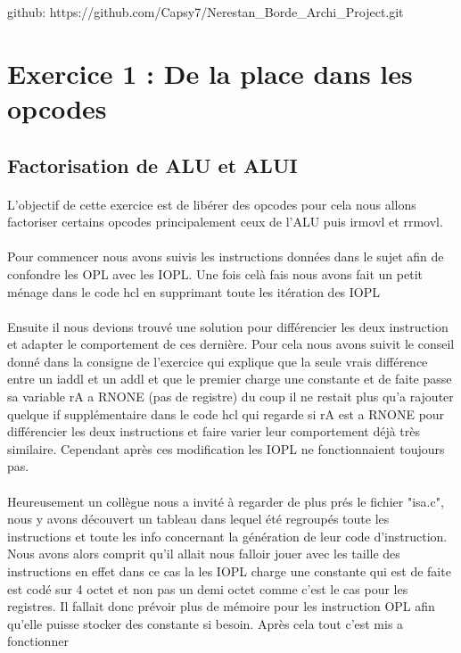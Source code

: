 \documentclass[12pt]{article}
\begin{document}
github: https://github.com/Capsy7/Nerestan_Borde_Archi_Project.git 

\newpage


\section{Exercice 1 : De la place dans les opcodes}
\subsection{Factorisation de ALU et ALUI}

\paragraph{}L'objectif de cette exercice est de libérer des opcodes pour cela nous allons factoriser certains opcodes principalement ceux de l'ALU puis irmovl et rrmovl.

\paragraph{}Pour commencer nous avons suivis les instructions données dans le sujet afin de confondre les OPL avec les IOPL. Une fois celà fais nous avons fait un petit ménage
dans le code hcl en supprimant toute les itération des IOPL

\paragraph{}Ensuite il nous devions trouvé une solution pour différencier les deux instruction
et adapter le comportement de ces dernière. Pour cela nous avons suivit le conseil
donné dans la consigne de l’exercice qui explique que la seule vrais différence entre un iaddl et un addl et que le premier charge une constante et de faite passe sa variable rA a RNONE (pas de registre) du coup il ne restait plus qu'a rajouter quelque if supplémentaire dans le code hcl qui regarde si rA est a RNONE pour différencier les deux instructions et faire varier leur comportement déjà très similaire. Cependant après ces modification les IOPL ne fonctionnaient toujours pas.

\paragraph{}Heureusement un collègue nous a invité à regarder de plus prés le fichier "isa.c", nous y avons découvert un tableau dans lequel été regroupés toute les instructions
et toute les info concernant la génération de leur code d'instruction. Nous avons alors comprit qu'il allait nous falloir jouer avec les taille des instructions en
effet dans ce cas la les IOPL charge une constante qui est de faite est codé sur
4 octet et non pas un demi octet comme c’est le cas pour les registres. Il fallait donc prévoir plus de mémoire pour les instruction OPL afin qu'elle puisse stocker des constante si besoin. Après cela tout c'est mis a fonctionner
\end{document}
